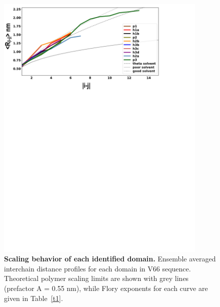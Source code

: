 \documentclass[10pt,letterpaper]{article}
\begin{document}
\begin{figure}[!ht]
\includegraphics[scale=0.5,width=0.9\textwidth,trim={0 0cm 0 0cm},clip]{../figures/S3.pdf}
\caption{{\bf Scaling behavior of each identified domain.} Ensemble averaged interchain distance profiles for each domain in V66 sequence. Theoretical polymer scaling limits are shown with grey lines (prefactor A = 0.55 nm), while Flory exponents for each curve are given in Table~\ref{t1}. }
\label{S3} 
\end{figure}
\end{document}
